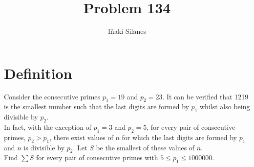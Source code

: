 \documentclass[english]{article}
\begin{document}
\newcommand{\mc}{\multicolumn}
\newcommand{\mr}{\multirow}
\newcommand{\cw}{\columnwidth}
\newcommand{\ig}[2]{\texttt{[image: \#2]}}

\title{Problem 134}
\author{I\~naki Silanes}
\maketitle

\section{Definition}

Consider the consecutive primes $p_1 = 19$ and $p_2 = 23$. It can be verified that 1219 is the smallest number such that the last digits are formed by $p_1$ whilst also being divisible by $p_2$.\\

In fact, with the exception of $p_1 = 3$ and $p_2 = 5$, for every pair of consecutive primes, $p_2 > p_1$, there exist values of $n$ for which the last digits are formed by $p_1$ and $n$ is divisible by $p_2$. Let $S$ be the smallest of these values of $n$.\\

Find $\sum S$ for every pair of consecutive primes with $5 \leq p_1 \leq 1000000$.
\end{document}
